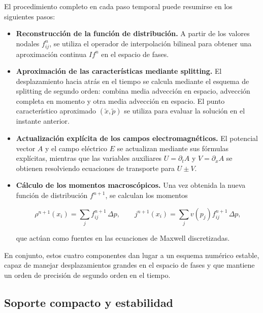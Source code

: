\documentclass[11pt,a4paper,twoside,pdf]{article}
\numberwithin{equation}{section}
\begin{document}
El procedimiento completo en cada paso temporal puede resumirse en los siguientes pasos:

\begin{itemize}
\item \textbf{Reconstrucción de la función de distribución.}  
A partir de los valores nodales $f^n_{ij}$, se utiliza el operador de interpolación
bilineal para obtener una aproximación continua $I f^n$ en el espacio de fases.


\item \textbf{Aproximación de las características mediante splitting.}  
El desplazamiento hacia atrás en el tiempo se calcula mediante el esquema de
splitting de segundo orden: combina media advección en espacio, advección
completa en momento y otra media advección en espacio.  
El punto característico aproximado $(\tilde{x},\tilde{p})$ se utiliza para evaluar la solución en el instante anterior.

\item \textbf{Actualización explícita de los campos electromagnéticos.}  
El potencial vector $A$ y el campo eléctrico $E$ se actualizan mediante sus fórmulas
explícitas, mientras que las variables auxiliares $U=\partial_t A$ y
$V=\partial_x A$ se obtienen resolviendo ecuaciones de transporte para
$U\pm V$.  


\item \textbf{Cálculo de los momentos macroscópicos.}  
Una vez obtenida la nueva función de distribución $f^{n+1}$, se calculan los
momentos


\[
\rho^{n+1}(x_i)=\sum_j f^{n+1}_{ij}\,\Delta p, \qquad
j^{n+1}(x_i)=\sum_j v(p_j)f^{n+1}_{ij}\,\Delta p,
\]


que actúan como fuentes en las ecuaciones de Maxwell discretizadas.
\end{itemize}

\medskip

En conjunto, estos cuatro componentes dan lugar a un esquema numérico estable,
capaz de manejar desplazamientos grandes en el espacio de fases y que mantiene un
orden de precisión de segundo orden en el tiempo.








\subsection{Soporte compacto y estabilidad}
\end{document}

